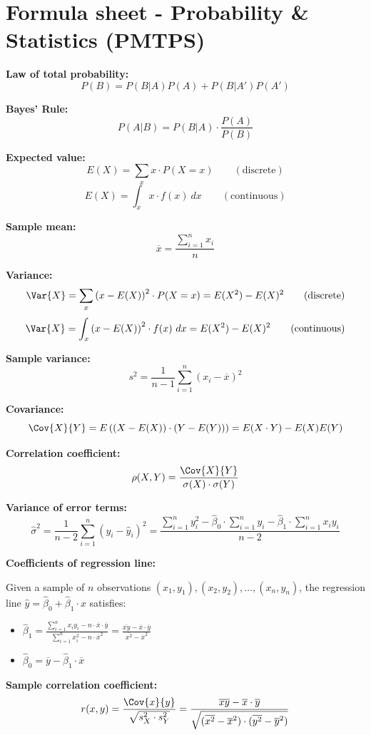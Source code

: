 \documentclass[11pt,a4paper,english]{article} %
\begin{document}
\section*{Formula sheet - Probability \& Statistics (PMTPS)}

\textbf{Law of total probability:}
\[ P(B) = P(B|A)P(A) + P(B|A')P(A')\]

\textbf{Bayes' Rule:}
\[ P(A|B) = P(B|A) \cdot \frac{P(A)}{P(B)} \]

\textbf{Expected value:}
\[
    E(X) = \sum_{x} x \cdot P(X = x) \qquad (\text{discrete})
\]
\[
    E(X) = \int_{x} x \cdot f(x)\ dx \qquad (\text{continuous})
\]

\textbf{Sample mean:}
\[
    \overline{x} = \frac{\sum_{i=1}^{n} x_{i}}{n}
\]

\textbf{Variance:}
\[
    \Var{X} = \sum_{x} \left(x - E(X)\right)^2 \cdot P(X = x) = E(X^2) - E(X)^2 \qquad (\text{discrete})
\]
\[
    \Var{X} = \int_{x} \left(x-E(X)\right)^2 \cdot f(x)\ dx = E(X^2) - E(X)^2 \qquad (\text{continuous})
\]

\textbf{Sample variance:}
\[
    s^2 = \frac{1}{n-1}\sum_{i=1}^{n} (x_{i} - \overline{x})^2
\]

\textbf{Covariance:}
\[
    \Cov{X}{Y} = E\left((X-E(X))\cdot(Y-E(Y))\right) = E(X \cdot Y) - E(X)E(Y)
\]

\textbf{Correlation coefficient:}
\[
    \rho(X, Y) = \frac{\Cov{X}{Y}}{\sigma(X) \cdot \sigma(Y)}
\]

\textbf{Variance of error terms:}
\[ \hat{\sigma}^2 = \frac{1}{n-2}\sum_{i=1}^{n} (y_{i} - \hat{y}_{i})^2 = \frac{\sum_{i=1}^{n} y_{i}^2 - \hat{\beta}_{0}\cdot \sum_{i=1}^{n} y_{i} - \hat{\beta}_{1}\cdot \sum_{i=1}^{n} x_{i}y_{i}}{n-2}\]

\textbf{Coefficients of regression line:}

Given a sample of $n$ observations $(x_1, y_1), (x_2, y_2), \ldots, (x_n, y_n)$, the regression line $\hat{y} = \hat{\beta}_0 + \hat{\beta}_{1}\cdot x$ satisfies:
\begin{itemize}
    \item $\hat{\beta}_{1} = \frac{\sum_{i=1}^{n}x_iy_i - n \cdot \overline{x} \cdot \overline{y}}{\sum_{i=1}^{n} x_{i}^2 - n \cdot \overline{x}^2} = \frac{\overline{xy}-\overline{x}\cdot \overline{y}}{\overline{x^2}-\overline{x}^2}$
    \item $\hat{\beta}_{0} = \overline{y} - \hat{\beta}_{1} \cdot \overline{x}$
\end{itemize}

\textbf{Sample correlation coefficient:}
\[ r(x, y) = \frac{\Cov{x}{y}}{\sqrt{s_{X}^2\cdot s_{Y}^2}} = \frac{\overline{xy} - \overline{x} \cdot \overline{y}}{\sqrt{(\overline{x^2} - \overline{x}^2)\cdot(\overline{y^2} - \overline{y}^2)}}\]
\end{document}
